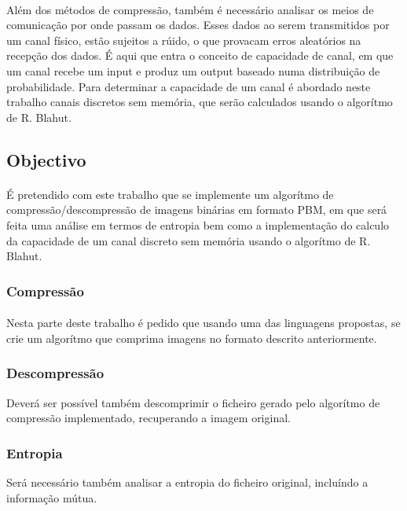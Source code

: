 \documentclass[paper=a4, fontsize=11pt]{scrartcl}
\numberwithin{equation}{section}		%
\numberwithin{figure}{section}			%
\numberwithin{table}{section}				%
\begin{document}
    \paragraph{} Além dos métodos de compressão, também é necessário analisar os meios de comunicação por onde passam os dados. Esses dados ao serem transmitidos por um canal físico, estão sujeitos a rúido, o que provacam erros aleatórios na recepção dos dados. É aqui que entra o conceito de capacidade de canal, em que um canal recebe um input e produz um output baseado numa distribuição de probabilidade. Para determinar a capacidade de um canal é abordado neste trabalho canais discretos sem memória, que serão calculados usando o algorítmo de R. Blahut.
    
    
\subsection{Objectivo}
  	\paragraph{} É pretendido com este trabalho que se implemente um algorítmo de compressão/descompressão de imagens binárias em formato PBM, em que será feita uma análise em termos de entropia bem como a implementação do calculo da capacidade de um canal discreto sem memória usando o algorítmo de R. Blahut.
  	
\subsubsection{Compressão}\paragraph{} Nesta parte deste trabalho é pedido que usando uma das linguagens propostas, se crie um algorítmo que comprima imagens no formato descrito anteriormente.
\subsubsection{Descompressão}Deverá ser possível também descomprimir o ficheiro gerado pelo algorítmo de compressão implementado, recuperando a imagem original.
\subsubsection{Entropia}Será necessário também analisar a entropia do ficheiro original, incluíndo a informação mútua. 
\end{document}
